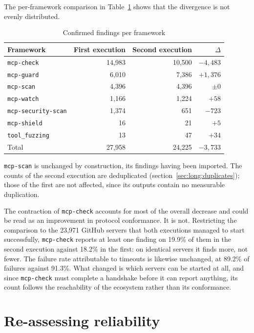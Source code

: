 The per-framework comparison in Table~\ref{tab:long:framework} shows that the
divergence is not evenly distributed.

\begin{table}[htbp]
\centering
\caption{Confirmed findings per framework}
\label{tab:long:framework}
\begin{tabular}{lrrr}
\toprule
Framework & First execution & Second execution & $\Delta$ \\
\midrule
\texttt{mcp-check}         & 14,983 & 10,500 & $-4,483$ \\
\texttt{mcp-guard}         &  6,010 &  7,386 & $+1,376$ \\
\texttt{mcp-scan}          &  4,396 &  4,396 & $\pm 0$ \\
\texttt{mcp-watch}         &  1,166 &  1,224 & $+58$ \\
\texttt{mcp-security-scan} &  1,374 &    651 & $-723$ \\
\texttt{mcp-shield}        &     16 &     21 & $+5$ \\
\texttt{tool\_fuzzing}     &     13 &     47 & $+34$ \\
\midrule
Total                      & 27,958 & 24,225 & $-3,733$ \\
\bottomrule
\end{tabular}

\vspace{2mm}
\footnotesize
\texttt{mcp-scan} is unchanged by construction, its findings having been
imported. The counts of the second execution are deduplicated
(section~\ref{sec:long:duplicates}); those of the first are not affected, since
its outputs contain no measurable duplication.
\end{table}

The contraction of \texttt{mcp-check} accounts for most of the overall decrease
and could be read as an improvement in protocol conformance. It is not.
Restricting the comparison to the 23,971 GitHub servers that both executions
managed to start successfully, \texttt{mcp-check} reports at least one finding on
19.9\% of them in the second execution against 18.2\% in the first: on identical
servers it finds more, not fewer. The failure rate attributable to timeouts is
likewise unchanged, at 89.2\% of failures against 91.3\%. What changed is which
servers can be started at all, and since \texttt{mcp-check} must complete a
handshake before it can report anything, its count follows the reachability of
the ecosystem rather than its conformance.

\section{Re-assessing reliability}
\label{sec:long:reliability}

